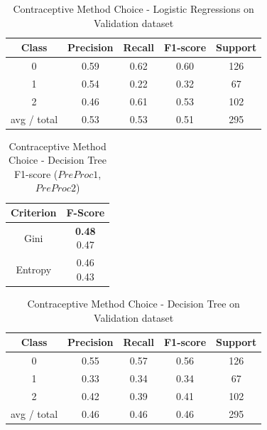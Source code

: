 \begin{table}[p]
\begin{center}
\begin{tabular}{|c|c|c|c|c|}
\hline Class & Precision & Recall & F1-score & Support \\

\hline 0 & 0.59 & 0.62 & 0.60 & 126\\
\hline 1 & 0.54 & 0.22 & 0.32 & 67\\
\hline 2 & 0.46 & 0.61 & 0.53 & 102\\
\hline avg / total & 0.53 & 0.53 & 0.51 & 295\\
\hline
\end{tabular}

\caption{Contraceptive Method Choice - Logistic Regressions on Validation dataset}
\label{ds1:table:logisticregression-validation}
\end{center}
\end{table}

\begin{table}[p]
\begin{center}
\begin{tabular}{|c|c|}
\hline Criterion & F-Score \\

\hline Gini & \minibox{\textbf{0.48}\\ 0.47} \\

\hline Entropy & \minibox{0.46\\ 0.43} \\

\hline
\end{tabular}

\caption{Contraceptive Method Choice - Decision Tree F1-score ($PreProc1$, $PreProc2$)}
\label{ds1:table:decisiontree}
\end{center}
\end{table}


\begin{table}[p]
\begin{center}
\begin{tabular}{|c|c|c|c|c|}
\hline Class & Precision & Recall & F1-score & Support \\

\hline 0 & 0.55 & 0.57 & 0.56 & 126\\
\hline 1 & 0.33 & 0.34 & 0.34 & 67\\
\hline 2 & 0.42 & 0.39 & 0.41 & 102\\
\hline avg / total & 0.46 & 0.46 & 0.46 & 295\\
\hline
\end{tabular}

\caption{Contraceptive Method Choice - Decision Tree on Validation dataset}
\label{ds1:table:decisiontree-validation}
\end{center}
\end{table}


